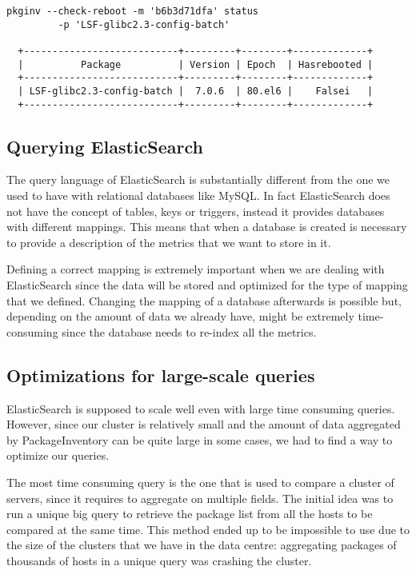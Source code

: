 \begin{itemize}
  \begin{lstlisting}[frame=single,basicstyle=\footnotesize\ttfamily]
  pkginv --check-reboot -m 'b6b3d71dfa' status
         -p 'LSF-glibc2.3-config-batch'

  +---------------------------+---------+--------+-------------+
  |          Package          | Version | Epoch  | Hasrebooted |
  +---------------------------+---------+--------+-------------+
  | LSF-glibc2.3-config-batch |  7.0.6  | 80.el6 |    Falsei   |
  +---------------------------+---------+--------+-------------+
  \end{lstlisting} 

\end{itemize}

\subsection{Querying ElasticSearch}

The query language of ElasticSearch is substantially different from the
one we used to have with relational databases like MySQL\@. In fact
ElasticSearch does not have the concept of tables, keys or triggers,
instead it provides databases with different mappings. This means that
when a database is created is necessary to provide a description of the
metrics that we want to store in it.

Defining a correct mapping is extremely important when we are dealing with
ElasticSearch since the data will be stored and optimized for the type of
mapping that we defined. Changing the mapping of a database afterwards is
possible but, depending on the amount of data we already have, might be
extremely time-consuming since the database needs to re-index all the
metrics.

\subsection{Optimizations for large-scale queries}

ElasticSearch is supposed to scale well even with large time consuming
queries. However, since our cluster is relatively small and the amount of
data aggregated by PackageInventory can be quite large in some cases, we
had to find a way to optimize our queries.

The most time consuming query is the one that is used to compare a cluster
of servers, since it requires to aggregate on multiple fields. The initial
idea was to run a unique big query to retrieve the package list from all
the hosts to be compared at the same time. This method ended up to be
impossible to use due to the size of the clusters that we have in the
data centre: aggregating packages of thousands of hosts in a unique query
was crashing the cluster.

